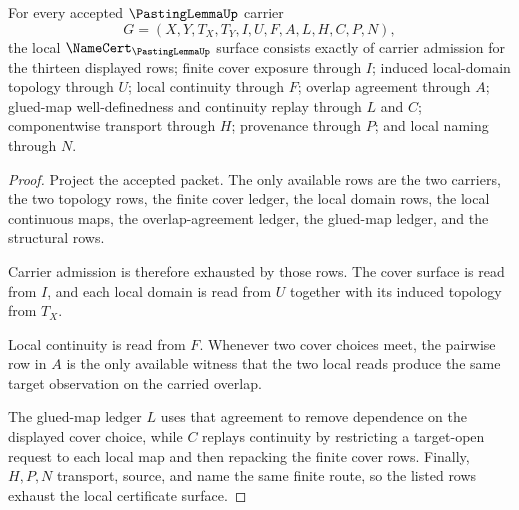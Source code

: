 \begin{theorem}
\label{thm:pasting-lemma-namecert-obligations}
For every accepted $\PastingLemmaUp$ carrier
$$
G=(X,Y,T_X,T_Y,I,U,F,A,L,H,C,P,N),
$$
the local $\NameCert_{\PastingLemmaUp}$ surface consists exactly of carrier admission for the thirteen displayed rows; finite cover exposure through $I$; induced local-domain topology through $U$; local continuity through $F$; overlap agreement through $A$; glued-map well-definedness and continuity replay through $L$ and $C$; componentwise transport through $H$; provenance through $P$; and local naming through $N$.
\end{theorem}
\begin{proof}
Project the accepted packet. The only available rows are the two carriers, the two topology rows, the finite cover ledger, the local domain rows, the local continuous maps, the overlap-agreement ledger, the glued-map ledger, and the structural rows.

Carrier admission is therefore exhausted by those rows. The cover surface is read from $I$, and each local domain is read from $U$ together with its induced topology from $T_X$.

Local continuity is read from $F$. Whenever two cover choices meet, the pairwise row in $A$ is the only available witness that the two local reads produce the same target observation on the carried overlap.

The glued-map ledger $L$ uses that agreement to remove dependence on the displayed cover choice, while $C$ replays continuity by restricting a target-open request to each local map and then repacking the finite cover rows. Finally, $H,P,N$ transport, source, and name the same finite route, so the listed rows exhaust the local certificate surface.
\end{proof}

